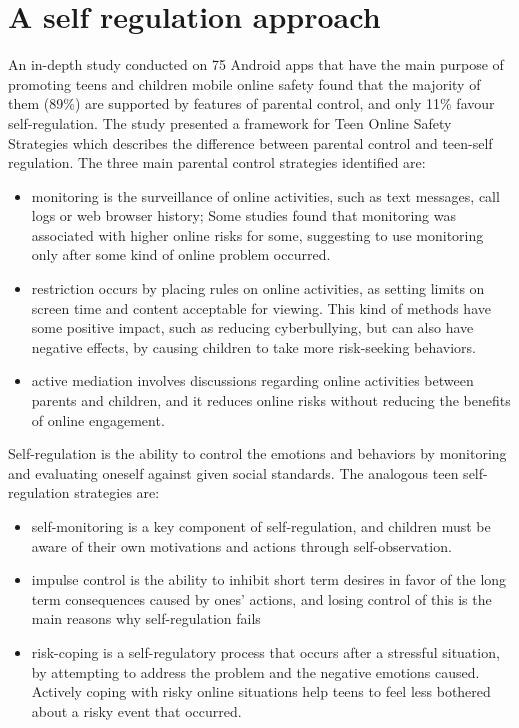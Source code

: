 
\section{A self regulation approach}

An in-depth study conducted on 75 Android apps that have the main purpose of promoting teens and children mobile online safety found that the majority of them (89\%) are supported by features of parental control, and only 11\% favour self-regulation. The study presented a framework for Teen Online Safety Strategies which describes the difference between parental control and teen-self regulation. The three main parental control strategies identified are:

\begin{itemize}
\item monitoring is the surveillance of online activities, such as text messages, call logs or web browser history; Some studies found that monitoring was associated with higher online risks for some, suggesting to use monitoring only after some kind of online problem occurred.\parencite{duerager2012can}
\item restriction occurs by placing rules on online activities, as setting limits on screen time and content acceptable for viewing. This kind of methods have some positive impact, such as reducing cyberbullying, but can also have negative effects, by causing children to take more risk-seeking behaviors. \parencite{shin2014exploring}
\item active mediation involves discussions regarding online activities between parents and children, and it reduces online risks without reducing the benefits of online engagement. \parencite{duerager2012can}
\end{itemize}

Self-regulation is the ability to control the emotions and behaviors by monitoring and evaluating oneself against given social standards. The analogous teen self-regulation strategies are:

\begin{itemize}
\item self-monitoring is a key component of self-regulation, and children must be aware of their own motivations and actions through self-observation. \parencite{bandura1991social}
\item impulse control is the ability to inhibit short term desires in favor of the long term consequences caused by ones' actions, and losing control of this is the main reasons why self-regulation fails \parencite{baumeister1996self}
\item risk-coping is a self-regulatory process that occurs after a stressful situation, by attempting to address the problem and the negative emotions caused. Actively coping with risky online situations help teens to feel less bothered about a risky event that occurred. \parencite{d2013cope}
\end{itemize}

